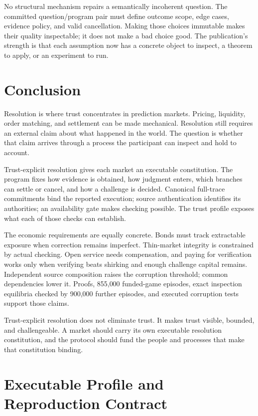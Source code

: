 \documentclass[10pt]{article}
\begin{document}
No structural mechanism repairs a semantically incoherent question. The committed question/program pair must define outcome scope, edge cases, evidence policy, and valid cancellation. Making those choices immutable makes their quality inspectable; it does not make a bad choice good. The publication's strength is that each assumption now has a concrete object to inspect, a theorem to apply, or an experiment to run.

\section{Conclusion}

Resolution is where trust concentrates in prediction markets. Pricing, liquidity, order matching, and settlement can be made mechanical. Resolution still requires an external claim about what happened in the world. The question is whether that claim arrives through a process the participant can inspect and hold to account.

Trust-explicit resolution gives each market an executable constitution. The program fixes how evidence is obtained, how judgment enters, which branches can settle or cancel, and how a challenge is decided. Canonical full-trace commitments bind the reported execution; source authentication identifies its authorities; an availability gate makes checking possible. The trust profile exposes what each of those checks can establish.

The economic requirements are equally concrete. Bonds must track extractable exposure when correction remains imperfect. Thin-market integrity is constrained by actual checking. Open service needs compensation, and paying for verification works only when verifying beats shirking and enough challenge capital remains. Independent source composition raises the corruption threshold; common dependencies lower it. Proofs, 855{,}000 funded-game episodes, exact inspection equilibria checked by 900{,}000 further episodes, and executed corruption tests support those claims.

Trust-explicit resolution does not eliminate trust. It makes trust visible, bounded, and challengeable. A market should carry its own executable resolution constitution, and the protocol should fund the people and processes that make that constitution binding.

\appendix

\section{Executable Profile and Reproduction Contract}
\label{app:semantics}
\end{document}
